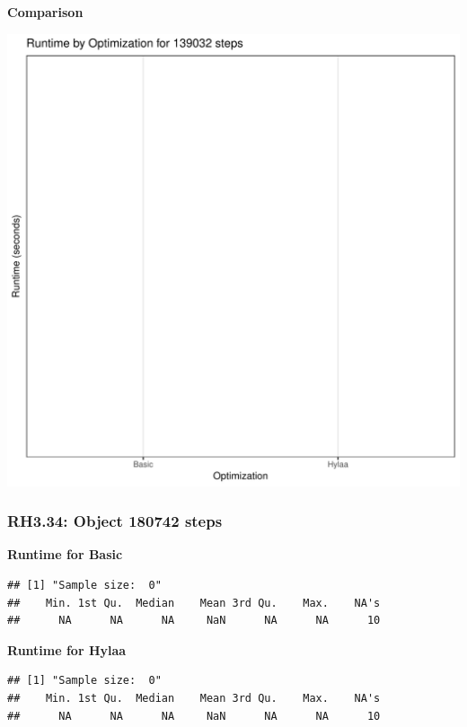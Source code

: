 \documentclass{article}\usepackage[]{graphicx}\usepackage[]{color}
\makeatletter
\def\maxwidth{ %
  \ifdim\Gin@nat@width>\linewidth
    \linewidth
  \else
    \Gin@nat@width
  \fi
}
\newenvironment{kframe}{%
 \def\at@end@of@kframe{}%
 \ifinner\ifhmode%
  \def\at@end@of@kframe{\end{minipage}}%
  \begin{minipage}{\columnwidth}%
 \fi\fi%
 \def\FrameCommand##1{\hskip\@totalleftmargin \hskip-\fboxsep
 \colorbox{shadecolor}{##1}\hskip-\fboxsep
     \hskip-\linewidth \hskip-\@totalleftmargin \hskip\columnwidth}%
 \MakeFramed {\advance\hsize-\width
   \@totalleftmargin\z@ \linewidth\hsize
   \@setminipage}}%
 {\par\unskip\endMakeFramed%
 \at@end@of@kframe}
\newenvironment{knitrout}{}{} %
\makeatother
\begin{document}
 \textbf{Comparison}
  
\begin{knitrout}
\color{fgcolor}
\includegraphics[width=\maxwidth]{figure/RH3_steps139032-1} 

\end{knitrout}


\subsubsection{RH3.34: Object 180742 steps}

 \textbf{Runtime for Basic}
\begin{knitrout}
\color{fgcolor}\begin{kframe}
\begin{verbatim}
## [1] "Sample size:  0"
##    Min. 1st Qu.  Median    Mean 3rd Qu.    Max.    NA's 
##      NA      NA      NA     NaN      NA      NA      10
\end{verbatim}
\end{kframe}
\end{knitrout}
 \textbf{Runtime for Hylaa}
\begin{knitrout}
\color{fgcolor}\begin{kframe}
\begin{verbatim}
## [1] "Sample size:  0"
##    Min. 1st Qu.  Median    Mean 3rd Qu.    Max.    NA's 
##      NA      NA      NA     NaN      NA      NA      10
\end{verbatim}
\end{kframe}
\end{knitrout}
  
\end{document}
